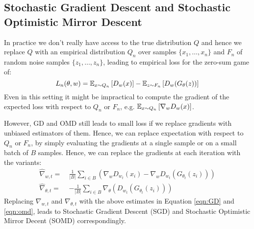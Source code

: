 \subsection{Stochastic Gradient Descent and Stochastic Optimistic Mirror Descent}

In practice we don't really have access to the true distribution $Q$ and hence we replace $Q$ with an empirical distribution $Q_n$ over samples $\{x_1,\ldots, x_n\}$ and $F_n$ of random noise samples $\{z_1,\ldots, z_n\}$, leading to empirical loss for the zero-sum game of:
\begin{equation}
L_n(\theta, w) = \mathbb{E}_{x\sim Q_n}\left[ D_w(x) \right] - \mathbb{E}_{z\sim F_n}\left[D_w(G_\theta(z))\right]
\end{equation}
Even in this setting it might be impractical to compute the gradient of the expected loss with respect to $Q_n$ or $F_n$, e.g. $\mathbb{E}_{x\sim Q_n}\left[ \nabla_w D_w(x)\right]$.

However, GD and OMD still leads to small loss if we replace gradients with unbiased estimators of them. Hence, we can replace expectation with respect to $Q_n$ or $F_n$, by simply evaluating the gradients at a single sample or on a small batch of $B$ samples. Hence, we can replace the gradients at each iteration with the variants:
\begin{equation}\label{eqn:omd-gen}
\begin{aligned}
\hat{\nabla}_{w, t} =~& \frac{1}{|B|} \sum_{i\in B}\left( \nabla_w D_{w_t}(x_i) - \nabla_{w} D_{w_t}(G_{\theta_t}(z_i))\right)\\
\hat{\nabla}_{\theta, t}  =~& - \frac{1}{|B|}\sum_{i\in B} \nabla_{\theta} (D_{w_t}(G_{\theta_t}(z_i)))
\end{aligned}
\end{equation}
Replacing $\nabla_{w,t}$ and $\nabla_{\theta,t}$ with the above estimates in Equation \eqref{eqn:GD} and \eqref{eqn:omd}, leads to Stochastic Gradient Descent (SGD) and Stochastic Optimistic Mirror Decent (SOMD) correspondingly.
